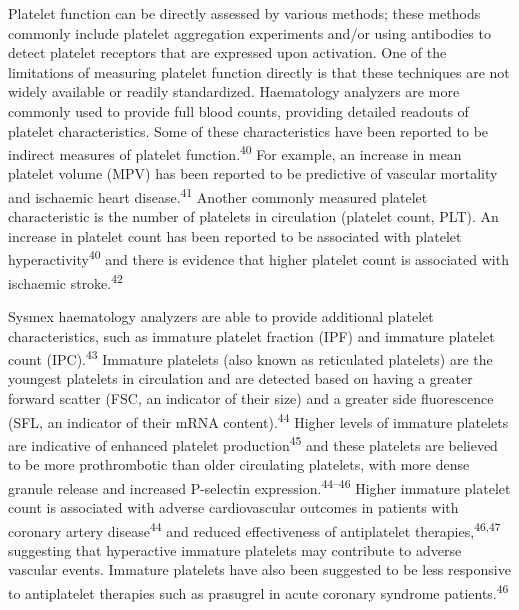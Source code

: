 \documentclass[11pt,twoside]{bristolthesis}
\begin{document}
Platelet function can be directly assessed by various methods; these methods commonly include platelet aggregation experiments and/or using antibodies to detect platelet receptors that are expressed upon activation. One of the limitations of measuring platelet function directly is that these techniques are not widely available or readily standardized. Haematology analyzers are more commonly used to provide full blood counts, providing detailed readouts of platelet characteristics. Some of these characteristics have been reported to be indirect measures of platelet function.\textsuperscript{40} For example, an increase in mean platelet volume (MPV) has been reported to be predictive of vascular mortality and ischaemic heart disease.\textsuperscript{41} Another commonly measured platelet characteristic is the number of platelets in circulation (platelet count, PLT). An increase in platelet count has been reported to be associated with platelet hyperactivity\textsuperscript{40} and there is evidence that higher platelet count is associated with ischaemic stroke.\textsuperscript{42}

Sysmex haematology analyzers are able to provide additional platelet characteristics, such as immature platelet fraction (IPF) and immature platelet count (IPC).\textsuperscript{43} Immature platelets (also known as reticulated platelets) are the youngest platelets in circulation and are detected based on having a greater forward scatter (FSC, an indicator of their size) and a greater side fluorescence (SFL, an indicator of their mRNA content).\textsuperscript{44} Higher levels of immature platelets are indicative of enhanced platelet production\textsuperscript{45} and these platelets are believed to be more prothrombotic than older circulating platelets, with more dense granule release and increased P-selectin expression.\textsuperscript{44--46} Higher immature platelet count is associated with adverse cardiovascular outcomes in patients with coronary artery disease\textsuperscript{44} and reduced effectiveness of antiplatelet therapies,\textsuperscript{46,47} suggesting that hyperactive immature platelets may contribute to adverse vascular events. Immature platelets have also been suggested to be less responsive to antiplatelet therapies such as prasugrel in acute coronary syndrome patients.\textsuperscript{46}
\end{document}
